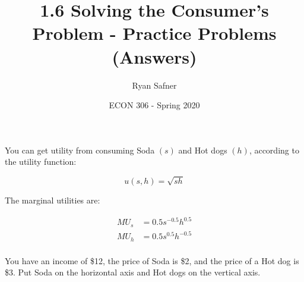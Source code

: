 \documentclass[12 pt]{exam}
\title{1.6 Solving the Consumer's Problem - Practice Problems (Answers)}
\author{Ryan Safner}
\date{ECON 306 - Spring 2020}
\begin{document}
\maketitle

You can get utility from consuming Soda $(s)$ and Hot dogs $(h)$, according to the utility function:

\begin{equation*}
u(s,h)=\sqrt{sh}\end{equation*}

The marginal utilities are:

\begin{align*}
MU_s&=0.5s^{-0.5}h^{0.5}	\\
MU_h&=0.5s^{0.5}h^{-0.5} \\ \end{align*}

You have an income of \$12, the price of Soda is \$2, and the price of a Hot dog is \$3. Put Soda on the horizontal axis and Hot dogs on the vertical axis.
\end{document}
